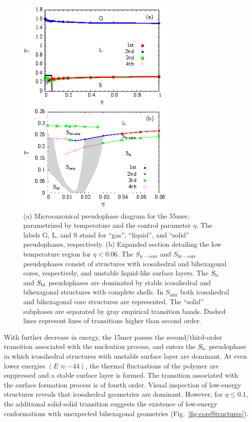 \documentclass[12pt]{report}
\begin{document}
\begin{figure}
\center
    \includegraphics[width=0.70\textwidth]{chapter6Figs/phaseDiag55.eps}%
 	\caption{\label{fig:phaseDiagram55} (a) Microcanonical pseudophase diagram for the $55$mer,  parametrized by temperature and the control parameter $\eta$. The labels G, L, and S stand for ``gas'', ``liquid'', and ``solid'' pseudophases, respectively. (b) Expanded section detailing the low temperature region for $\eta < 0.06$. The $S_{\mathrm{ic-core}}$ and $S_{\mathrm{bi-core}}$ pseudophases consist of structures with icosahedral and bihexagonal cores, respectively, and unstable liquid-like surface layers. The $S_{\rm ic}$ and $S_{\rm bi}$ pseudophases are dominated by stable icosahedral and bihexagonal structures with complete shells. In $S_{\mathrm{mix}}$ both icosahedral and bihexagonal core structures are represented. The ``solid'' subphases are separated by gray empirical transition bands. Dashed lines represent lines of transitions higher than second order.}
\end{figure}

With further decrease in energy, the 15mer passes the second/third-order transition associated with the nucleation process, and enters the $S_{\rm ic}$ pseudophase in which icosahedral structures with unstable surface layer are dominant. At even lower energies $(E \approx -44)$, the thermal fluctuations of the polymer are suppressed and a stable surface layer is formed. The transition associated with the surface formation process is of fourth order. Visual inspection of low-energy structures reveals that icosahedral geometries are dominant. However, for $\eta \leq 0.1$, the additional solid-solid transition suggests the existence of low-energy conformations with unexpected bihexagonal geometries (Fig.~\ref{fig:coreStructures}).
\end{document}
